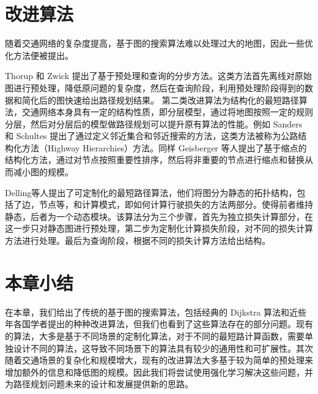\documentclass{standalone}
\begin{document}
\section{改进算法}
随着交通网络的复杂度提高，基于图的搜索算法难以处理过大的地图，因此一些优化方法便被提出。\par
Thorup 和 Zwick 提出了基于预处理和查询的分步方法。这类方法首先离线对原始图进行预处理，降低原问题的复杂度，然后在查询阶段，利用预处理阶段得到的数据和简化后的图快速给出路径规划结果。
第二类改进算法为结构化的最短路径算法，交通网络本身具有一定的结构性质，即分层模型，通过将地图按照一定的规则分层，然后对分层后的模型做路径规划可以提升原有算法的性能。例如 Sanders 和 Schultes 提出了通过定义邻近集合和邻近搜索的方法，这类方法被称为公路结构化方法（Highway Hierarchies）方法。同样 Geisberger 等人提出了基于缩点的结构化方法，通过对节点按照重要性排序，然后将非重要的节点进行缩点和替换从而减小图的规模。\par
Delling等人提出了可定制化的最短路径算法，他们将图分为静态的拓扑结构，包括了边，节点等，和计算模式，即如何计算行驶损失的方法两部分。使得前者维持静态，后者为一个动态模块。该算法分为三个步骤，首先为独立损失计算部分，在这一步只对静态图进行预处理，第二步为定制化计算损失阶段，对不同的损失计算方法进行处理。最后为查询阶段，根据不同的损失计算方法给出结构。

\section{本章小结}
在本章，我们给出了传统的基于图的搜索算法，包括经典的 Dijkstra 算法和近些年各国学者提出的种种改进算法，但我们也看到了这些算法存在的部分问题。现有的算法，大多是基于不同场景的定制化算法，对于不同的最短路计算函数，需要单独设计不同的算法，这导致不同场景下的算法具有较少的通用性和可扩展性。其次随着交通场景的复杂化和规模增大，现有的改进算法大多基于较为简单的预处理来增加额外的信息和降低图的规模。因此我们将尝试使用强化学习解决这些问题，并为路径规划问题未来的设计和发展提供新的思路。
\end{document}

